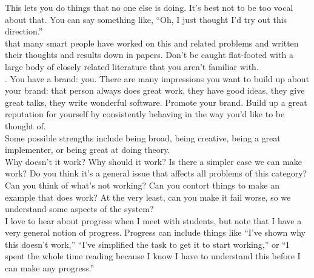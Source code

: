   This
  lets you do things that no one else is doing.  It's
  best not to be too vocal about that.  You can say something like,
  ``Oh, I just thought I'd try out this direction.'' \\
  
 that many smart people have
  worked on this and related problems and written their thoughts and results
  down in papers.  Don't be caught flat-footed with a large body of closely
  related literature that you aren't familiar with.  \\
  
.   You have a brand:  you.  There are many impressions you want to build up about your brand:  that person always does great work, they have good
  ideas, they give great talks, they write wonderful software.
  Promote your brand.  Build up a great reputation for yourself by  consistently behaving in the way you'd like to be thought of.\\


  Some
  possible strengths include  being broad, being creative, being  a great implementer, or being great at doing theory.  \\
  
  Why  doesn't it work?  Why should it work?   Is there a simpler case we  can make work?  Do you think it's a general issue that affects all
  problems of this category?  Can you think of what's  not working?  Can you contort things
 to make an example that does work?  At the very least, can you make it fail
 worse, so we understand some aspects of the system?  \\
 
 I love to hear about progress when I meet with students, but  note that  I have a very general notion of
 progress.  Progress can include things like ``I've shown why this doesn't work,'' ``I've
 simplified the task to get it to start working,'' or ``I spent the
 whole time reading because I know I have to understand this before I
 can make any progress.'' \\
 
